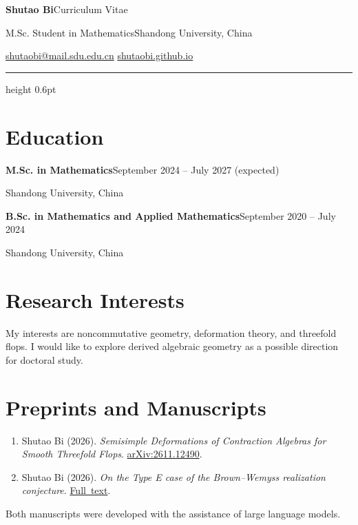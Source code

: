 \documentclass[a4paper,12pt]{article}
\newcommand{\degreeentry}[2]{\textbf{#1}\hfill{\small #2}\par Shandong University, China\par}
\begin{document}
\color{ink}
{\fontsize{30}{34}\selectfont\bfseries Shutao Bi}\hfill{\small Curriculum Vitae}\par
\vspace{3pt}
M.Sc. Student in Mathematics\enspace\textbar\enspace Shandong University, China\par
\vspace{3pt}
\href{mailto:shutaobi@mail.sdu.edu.cn}{shutaobi@mail.sdu.edu.cn}\enspace\textbar\enspace
\href{https://shutaobi.github.io/}{shutaobi.github.io}\par
\vspace{6pt}
{\color{accent}\hrule height 0.6pt}

\section*{Education}
\degreeentry{M.Sc. in Mathematics}{September 2024 -- July 2027 (expected)}
\vspace{4pt}
\degreeentry{B.Sc. in Mathematics and Applied Mathematics}{September 2020 -- July 2024}

\section*{Research Interests}
My interests are noncommutative geometry, deformation theory, and threefold flops. I would like to explore derived algebraic geometry as a possible direction for doctoral study.

\section*{Preprints and Manuscripts}
\begin{enumerate}
  \item Shutao Bi (2026). \emph{Semisimple Deformations of Contraction Algebras for Smooth Threefold Flops}.
    \href{https://arxiv.org/abs/2611.12490}{arXiv:2611.12490}.
  \item Shutao Bi (2026). \emph{On the Type E case of the Brown--Wemyss realization conjecture}.
    \href{https://shutaobi.github.io/thesis/Geometric_Realization.pdf}{Full~text}.
\end{enumerate}
Both manuscripts were developed with the assistance of large language models.
\end{document}
